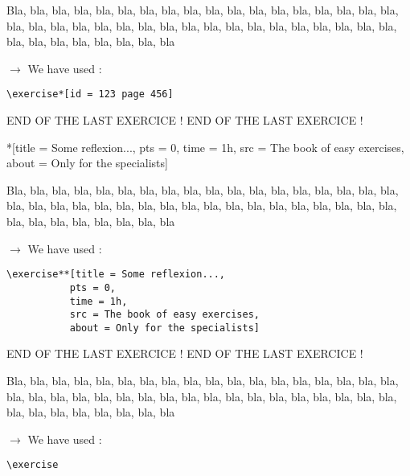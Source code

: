 \documentclass[12pt]{article}
\newcommand\blabla{%
		\noindent%
		Bla, bla, bla, bla, bla, bla, bla, bla, bla, bla, bla,
		bla, bla, bla, bla, bla, bla, bla, bla, bla, bla, bla,
		bla, bla, bla, bla, bla, bla, bla, bla, bla, bla, bla,
		bla, bla, bla, bla, bla, bla, bla, bla, bla, bla, bla
	}
\newcommand\codeused{%
		\blabla{} \medskip  \par
		\noindent $\rightarrow$ We have used :
	}
\begin{document}
\exercise*[id = 123 page 456]

\codeused{}
\begin{verbatim}
\exercise*[id = 123 page 456]
\end{verbatim}



\newpage \medskip \noindent END OF THE LAST EXERCICE ! END OF THE LAST EXERCICE !

\exercise**[title = Some reflexion..., pts = 0, time = 1h, src = The book of easy exercises, about = Only for the specialists]

\codeused{}
\begin{verbatim}
\exercise**[title = Some reflexion..., 
           pts = 0, 
           time = 1h,
           src = The book of easy exercises,
           about = Only for the specialists]
\end{verbatim}

\newpage \medskip \noindent END OF THE LAST EXERCICE ! END OF THE LAST EXERCICE !

\exercise

\codeused{}
\begin{verbatim}
\exercise
\end{verbatim}
\end{document}
